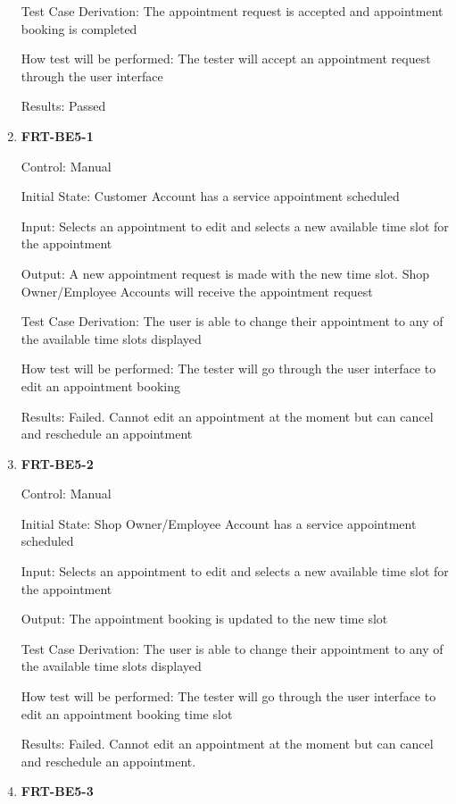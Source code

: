 \documentclass[12pt, titlepage]{article}
\begin{document}
\begin{enumerate}
	      Test Case Derivation: The appointment request is accepted and appointment booking is completed

	      How test will be performed: The tester will accept an appointment request through the user
	      interface

	      Results: Passed

	\item \textbf{FRT-BE5-1}

	      Control: Manual

	      Initial State: Customer Account has a service appointment scheduled

	      Input: Selects an appointment to edit and selects a new available time slot for the appointment

	      Output: A new appointment request is made with the new time slot. Shop Owner/Employee Accounts will
	      receive the appointment request

	      Test Case Derivation: The user is able to change their appointment to any of the available time
	      slots displayed

	      How test will be performed: The tester will go through the user interface to edit an appointment
	      booking

	      Results: Failed. Cannot edit an appointment at the moment but can cancel and reschedule an
	      appointment

	\item \textbf{FRT-BE5-2}

	      Control: Manual

	      Initial State: Shop Owner/Employee Account has a service appointment scheduled

	      Input: Selects an appointment to edit and selects a new available time slot for the appointment

	      Output: The appointment booking is updated to the new time slot

	      Test Case Derivation: The user is able to change their appointment to any of the available time
	      slots displayed

	      How test will be performed: The tester will go through the user interface to edit an appointment
	      booking time slot

	      Results: Failed. Cannot edit an appointment at the moment but can cancel and reschedule an
	      appointment.

	\item \textbf{FRT-BE5-3}


\end{enumerate}
\end{document}
